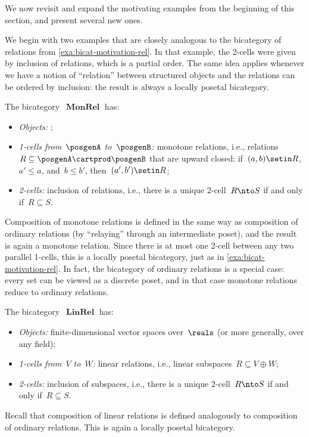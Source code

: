 
We now revisit and expand the motivating examples from the beginning of this section, and present several new ones.

We begin with two examples that are closely analogous to the bicategory of relations from \cref{exa:bicat-motivation-rel}.
In that example, the 2-cells were given by inclusion of relations, which is a partial order.
The same idea applies whenever we have a notion of ``relation'' between structured objects and the relations can be ordered by inclusion: the result is always a locally posetal bicategory.

\begin{example}
    \label{exa:bicat-monotone-rel}
    The bicategory~$\operatorname{\textbf{MonRel}}$ has:
    \begin{itemize}
        \item \emph{Objects:} ;
        \item \emph{1-cells from~$\posgenA$ to~$\posgenB$:} monotone relations, i.e., relations~$R \subseteq \posgenA \cartprod \posgenB$ that are upward closed: if~$(a, b) \setin R$, $a' \leq a$, and~$b \leq b'$, then~$(a', b') \setin R$;
        \item \emph{2-cells:} inclusion of relations, i.e., there is a unique 2-cell~$R \nto S$ if and only if~$R \subseteq S$.
    \end{itemize}
    Composition of monotone relations is defined in the same way as composition of ordinary relations (by ``relaying'' through an intermediate poset), and the result is again a monotone relation.
    Since there is at most one 2-cell between any two parallel 1-cells, this is a locally posetal bicategory, just as in \cref{exa:bicat-motivation-rel}.
    In fact, the bicategory of ordinary relations is a special case: every set can be viewed as a discrete poset, and in that case monotone relations reduce to ordinary relations.
\end{example}

\begin{example}
    \label{exa:bicat-linear-rel}
    The bicategory~$\operatorname{\textbf{LinRel}}$ has:
    \begin{itemize}
        \item \emph{Objects:} finite-dimensional vector spaces over~$\reals$ (or more generally, over any field);
        \item \emph{1-cells from~$V$ to~$W$:} linear relations, i.e., linear subspaces~$R \subseteq V \oplus W$;
        \item \emph{2-cells:} inclusion of subspaces, i.e., there is a unique 2-cell~$R \nto S$ if and only if~$R \subseteq S$.
    \end{itemize}
    Recall that composition of linear relations is defined analogously to composition of ordinary relations.
    This is again a locally posetal bicategory.
\end{example}

